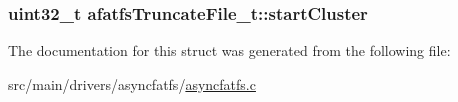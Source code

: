 \hypertarget{structafatfsTruncateFile__t_a2cc9aa531e70ede1838b247730cd9f60}{
\subsubsection[{start\+Cluster}]{\setlength{\rightskip}{0pt plus 5cm}uint32\+\_\+t afatfs\+Truncate\+File\+\_\+t\+::start\+Cluster}}\label{structafatfsTruncateFile__t_a2cc9aa531e70ede1838b247730cd9f60}


The documentation for this struct was generated from the following file\+:\begin{DoxyCompactItemize}
\item 
src/main/drivers/asyncfatfs/\hyperlink{asyncfatfs_8c}{asyncfatfs.\+c}\end{DoxyCompactItemize}
